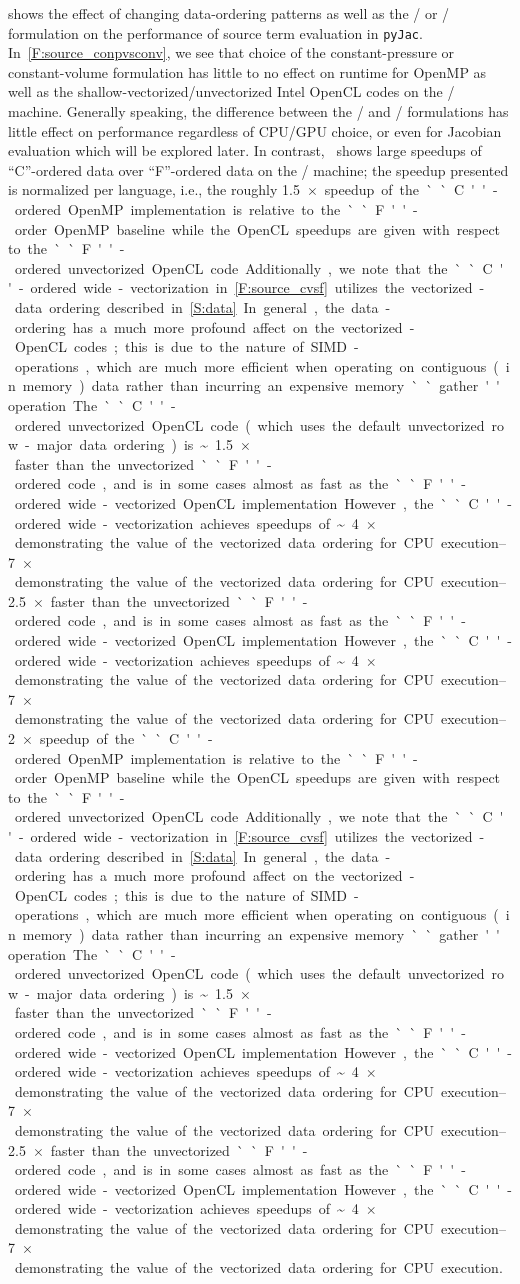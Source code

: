 \documentclass[12pt,number,sort&compress,preprint]{elsarticle}
\begin{document}
 shows the effect of changing data-ordering patterns as well as the \conp/ or \conv/ formulation on the performance of source term evaluation in \texttt{pyJac}.
In~\cref{F:source_conpvsconv}, we see that choice of the constant-pressure or constant-volume formulation has little to no effect on runtime for OpenMP as well as the shallow-vectorized\slash unvectorized Intel OpenCL codes on the \avx/ machine.
Generally speaking, the difference between the \conp/ and \conv/ formulations has little effect on performance regardless of CPU\slash GPU choice, or even for Jacobian evaluation which will be explored later.
In contrast,~ shows large speedups of ``C''-ordered data over ``F''-ordered data on the \avx/ machine; the speedup presented is normalized per language, i.e., the roughly \SIrange{1.5}{2}{$\times$} speedup of the ``C''-ordered OpenMP implementation is relative to the ``F''-order OpenMP baseline while the OpenCL speedups are given with respect to the ``F''-ordered unvectorized OpenCL code.
Additionally, we note that the ``C''-ordered wide-vectorization in~\cref{F:source_cvsf} utilizes the vectorized-data ordering described in~\cref{S:data}.
In general, the data-ordering has a much more profound affect on the vectorized-OpenCL codes; this is due to the nature of SIMD-operations, which are much more efficient when operating on contiguous (in memory) data rather than incurring an expensive memory ``gather'' operation.
The ``C''-ordered unvectorized OpenCL code (which uses the default unvectorized row-major data ordering) is \textasciitilde\SIrange{1.5}{2.5}{$\times$} faster than the unvectorized ``F''-ordered code, and is in some cases almost as fast as the ``F''-ordered wide-vectorized OpenCL implementation.
However, the ``C''-ordered wide-vectorization achieves speedups of \textasciitilde\SIrange{4}{7}{$\times$} demonstrating the value of the vectorized data ordering for CPU execution.
\end{document}
